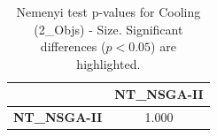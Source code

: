 \begin{table}[h!]
\centering
\scriptsize
\begin{tabular}{lc}
\toprule
 & NT\_NSGA-II \\
\midrule
\textbf{NT\_NSGA-II} & 1.000 \\
\bottomrule
\end{tabular}
\caption{Nemenyi test p-values for Cooling (2_Objs) - Size. Significant differences ($p < 0.05$) are highlighted.}
\label{tab:nemenyi_nemenyi_Cooling_2_Objs_Test_Size}
\end{table}